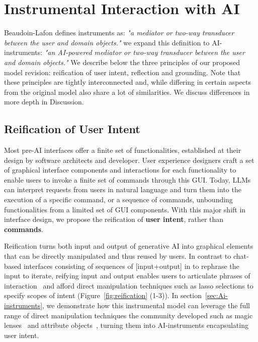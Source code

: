 \section{Instrumental Interaction with AI}

Beaudoin-Lafon defines instruments as: \textit{"a mediator or two-way transducer between the user and domain objects."} we expand this definition to AI-instruments: \textit{"an AI-powered mediator or two-way transducer between the user and domain objects."} We describe below the three principles of our proposed model revision: reification of user intent, reflection and grounding. Note that these principles are tightly interconnected and, while differing in certain aspects from the original model also share a lot of similarities. We discuss differences in more depth in Discussion.



\subsection{Reification of User Intent}

Most pre-AI interfaces offer a finite set of functionalities, established at their design by software architects and developer. User experience designers craft a set of graphical interface components and interactions for each functionality to enable users to invoke a finite set of commands through this GUI. Today, LLMs can interpret requests from users in natural language and turn them into the execution of a specific command, or a sequence of commands, unbounding functionalities from a limited set of GUI components. With this major shift in interface design, we propose the reification of \textbf{user intent}, rather than \textbf{commands}.


Reification turns both input and output of generative AI into graphical elements that can be directly manipulated and thus reused by users. In contrast to chat-based interfaces consisting of sequences of [input+output] in  to rephrase the input to iterate, reifying input and output enables users to articulate phrases of interaction~\cite{buxton1995chunking} and afford direct manipulation techniques such as lasso selections to specify scopes of intent (Figure~\ref{fig:reification} (1-3)).
In section~\ref{sec:Ai-instruments}, we demonstrate how this instrumental model can leverage the full range of direct manipulation techniques the community developed such as magic lenses~\cite{bier2023toolglass} and attribute objects~\cite{xia2016object}, turning them into AI-instruments encapsulating user intent.




